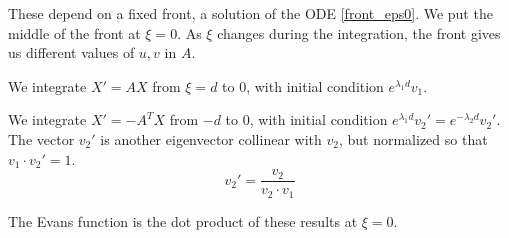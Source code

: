 \documentclass[10pt]{article}
\begin{document}
These depend on a fixed front, a solution of the ODE \eqref{front_eps0}.
We put the middle of the front at $\xi = 0$.  As $\xi$ changes during the integration, the front gives us different values of $u,v$ in $A$.

We integrate $X' = AX$ from $\xi = d$ to $0$, with initial condition $e^{\lambda_1 d}v_1$.

We integrate $X' = -A^T X$ from $-d$ to $0$, with initial condition $e^{\lambda_1 d}v_2' = e^{-\lambda_2 d}v_2'$. The vector $v_2'$ is another eigenvector collinear with $v_2$, but normalized so that $v_1 \cdot v_2' = 1$.
\[v_2' = \frac{v_2}{v_2 \cdot v_1}\]

The Evans function is the dot product of these results at $\xi = 0$.
\end{document}
